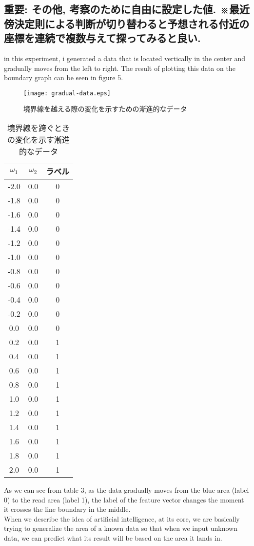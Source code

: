 \documentclass[a4j, twocolumn]{jarticle}
\begin{document}
\subsection{重要: その他, 考察のために自由に設定した値. ※最近傍決定則による判断が切り替わると予想される付近の座標を連続で複数与えて探ってみると良い.}
in this experiment, i generated a data that is located vertically in the center and gradually moves from the left to right. The result of plotting this data on the boundary graph can be seen in figure 5.
\begin{figure}
  \centering
  \texttt{[image: gradual-data.eps]}
  \caption{境界線を越える際の変化を示すための漸進的なデータ}\label{gradual-data-plot}
\end{figure}
\begin{table}[h]
  \centering
  \begin{tabular}{|c|c|c|}
    \hline
    $\omega_1$ & $\omega_2$ & ラベル \\
    \hline
    -2.0 & 0.0 & 0 \\
    -1.8 & 0.0 & 0 \\
    -1.6 & 0.0 & 0 \\
    -1.4 & 0.0 & 0 \\
    -1.2 & 0.0 & 0 \\
    -1.0 & 0.0 & 0 \\
    -0.8 & 0.0 & 0 \\
    -0.6 & 0.0 & 0 \\
    -0.4 & 0.0 & 0 \\
    -0.2 & 0.0 & 0 \\
     0.0 & 0.0 & 0 \\
     0.2 & 0.0 & 1 \\
     0.4 & 0.0 & 1 \\
     0.6 & 0.0 & 1 \\
     0.8 & 0.0 & 1 \\
     1.0 & 0.0 & 1 \\
     1.2 & 0.0 & 1 \\
     1.4 & 0.0 & 1 \\
     1.6 & 0.0 & 1 \\
     1.8 & 0.0 & 1 \\
     2.0 & 0.0 & 1 \\
    \hline
  \end{tabular}
  \caption{境界線を跨ぐときの変化を示す漸進的なデータ}\label{tab:boundary-gradient-data}
\end{table}
As we can see from table 3, as the data gradually moves from the blue area (label 0) to the read area (label 1), the label of the feature vector changes the moment it crosses the line boundary in the middle.\\
When we describe the idea of artificial intelligence, at its core, we are basically trying to generalize the area of a known data so that when we input unknown data, we can predict what its result will be based on the area it lands in.\\
\end{document}
